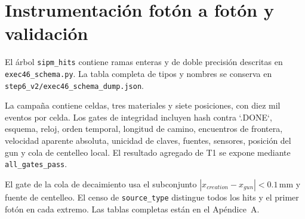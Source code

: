 \chapter{Instrumentación fotón a fotón y validación}
El árbol \texttt{sipm\_hits} contiene ramas enteras y de doble precisión descritas en \texttt{exec46\_schema.py}. La tabla completa de tipos y nombres se conserva en \texttt{step6\_v2/exec46\_schema\_dump.json}.

La campaña contiene \TOneCells{} celdas, tres materiales y siete posiciones, con diez mil eventos por celda. Los gates de integridad incluyen hash contra `.DONE`, esquema, reloj, orden temporal, longitud de camino, encuentros de frontera, velocidad aparente absoluta, unicidad de claves, fuentes, sensores, posición del gun y cola de centelleo local. El resultado agregado de T1 se expone mediante \texttt{all\_gates\_pass}.

El gate de la cola de decaimiento usa el subconjunto $|x_{creation}-x_{gun}|<0.1\,\mathrm{mm}$ y fuente de centelleo. El censo de \texttt{source\_type} distingue todos los hits y el primer fotón en cada extremo. Las tablas completas están en el Apéndice~A.
